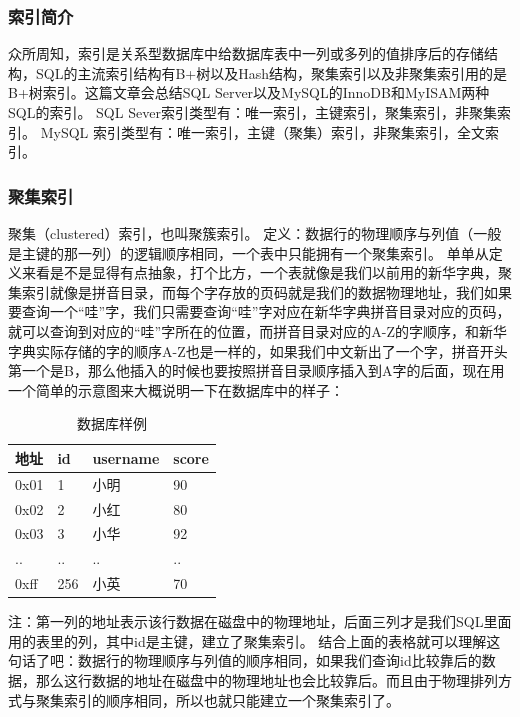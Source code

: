 \documentclass[UTF8]{ctexart}
\begin{document}
\subsubsection{索引简介}
众所周知，索引是关系型数据库中给数据库表中一列或多列的值排序后的存储结构，SQL的主流索引结构有B+树以及Hash结构，聚集索引以及非聚集索引用的是B+树索引。这篇文章会总结SQL Server以及MySQL的InnoDB和MyISAM两种 SQL的索引。
SQL Sever索引类型有：唯一索引，主键索引，聚集索引，非聚集索引。
MySQL 索引类型有：唯一索引，主键（聚集）索引，非聚集索引，全文索引。
\subsubsection{聚集索引}
聚集（clustered）索引，也叫聚簇索引。
定义：数据行的物理顺序与列值（一般是主键的那一列）的逻辑顺序相同，一个表中只能拥有一个聚集索引。
单单从定义来看是不是显得有点抽象，打个比方，一个表就像是我们以前用的新华字典，聚集索引就像是拼音目录，而每个字存放的页码就是我们的数据物理地址，我们如果要查询一个“哇”字，我们只需要查询“哇”字对应在新华字典拼音目录对应的页码，就可以查询到对应的“哇”字所在的位置，而拼音目录对应的A-Z的字顺序，和新华字典实际存储的字的顺序A-Z也是一样的，如果我们中文新出了一个字，拼音开头第一个是B，那么他插入的时候也要按照拼音目录顺序插入到A字的后面，现在用一个简单的示意图来大概说明一下在数据库中的样子：
\begin{table}[]
    \caption{数据库样例}
    \vspace{20pt}
    \centering
    \begin{tabular}{p{2cm}p{3cm}p{2.5cm}p{2.5cm}}
        \hline
        地址 & id  & username & score\\
        \hline
        0x01&	1	&小明	&90\\
		0x02	&2	&小红&	80\\
		0x03&	3	&小华&	92\\
		..	&..	&..	&..\\
		0xff&	256	&小英&	70\\
        \hline       
    \end{tabular}
    \label{bs2}
\end{table}
注：第一列的地址表示该行数据在磁盘中的物理地址，后面三列才是我们SQL里面用的表里的列，其中id是主键，建立了聚集索引。
结合上面的表格就可以理解这句话了吧：数据行的物理顺序与列值的顺序相同，如果我们查询id比较靠后的数据，那么这行数据的地址在磁盘中的物理地址也会比较靠后。而且由于物理排列方式与聚集索引的顺序相同，所以也就只能建立一个聚集索引了。
\end{document}
